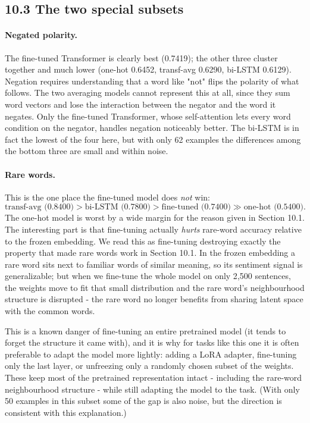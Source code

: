 \documentclass[11pt]{article}
\begin{document}
\subsection*{10.3 \quad The two special subsets}

\paragraph{Negated polarity.}
The fine-tuned Transformer is clearly best (0.7419); the other three cluster
together and much lower (one-hot 0.6452, transf-avg 0.6290, bi-LSTM 0.6129).
Negation requires understanding that a word like "not" flips the polarity of
what follows. The two averaging models cannot represent this at all, since they
sum word vectors and lose the interaction between the negator and the word it
negates. Only the fine-tuned Transformer, whose self-attention lets every word
condition on the negator, handles negation noticeably better. The bi-LSTM is in
fact the lowest of the four here, but with only 62 examples the differences
among the bottom three are small and within noise.

\paragraph{Rare words.}
This is the one place the fine-tuned model does \emph{not} win:
\[
\text{transf-avg (0.8400)} > \text{bi-LSTM (0.7800)} > \text{fine-tuned (0.7400)} \gg \text{one-hot (0.5400)}.
\]
The one-hot model is worst by a wide margin for the reason given in Section
10.1. The interesting part is that fine-tuning actually \emph{hurts} rare-word
accuracy relative to the frozen embedding. We read this as fine-tuning
destroying exactly the property that made rare words work in Section 10.1. In
the frozen embedding a rare word sits next to familiar words of similar
meaning, so its sentiment signal is generalizable; but when we fine-tune the
whole model on only 2{,}500 sentences, the weights move to fit that small
distribution and the rare word's neighbourhood structure is disrupted - the
rare word no longer benefits from sharing latent space with the common words.

This is a known danger of fine-tuning an entire pretrained model (it tends to
forget the structure it came with), and it is why for tasks like this one it is
often preferable to adapt the model more lightly: adding a LoRA adapter,
fine-tuning only the last layer, or unfreezing only a randomly chosen subset of
the weights. These keep most of the pretrained representation intact - including
the rare-word neighbourhood structure - while still adapting the model to the
task. (With only 50 examples in this subset some of the gap is also noise, but
the direction is consistent with this explanation.)
\end{document}
